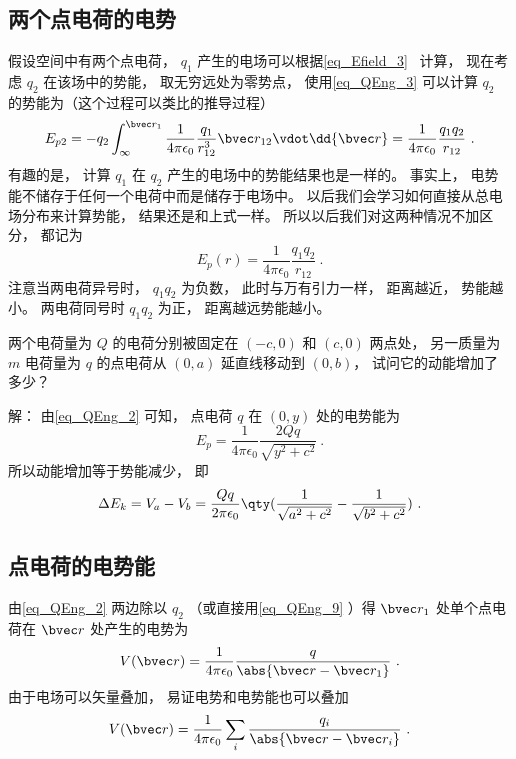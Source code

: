 \subsection{两个点电荷的电势}
假设空间中有两个点电荷， $q_1$ 产生的电场可以根据\autoref{eq_Efield_3}~ 计算， 现在考虑 $q_2$ 在该场中的势能， 取无穷远处为零势点， 使用\autoref{eq_QEng_3} 可以计算 $q_2$ 的势能为（这个过程可以类比的推导过程）
\begin{equation}
E_{p2} = -q_2 \int_{\infty}^{\bvec r_1} \frac{1}{4\pi\epsilon_0} \frac{q_1}{r_{12}^3}\bvec r_{12} \vdot \dd{\bvec r}
= \frac{1}{4\pi\epsilon_0} \frac{q_1 q_2}{r_{12}}~.
\end{equation}
有趣的是， 计算 $q_1$ 在 $q_2$ 产生的电场中的势能结果也是一样的。 事实上， 电势能不储存于任何一个电荷中而是储存于电场中。 以后我们会学习如何直接从总电场分布来计算势能， 结果还是和上式一样。 %
所以以后我们对这两种情况不加区分， 都记为
\begin{equation}\label{eq_QEng_2}
E_p(r) = \frac{1}{4\pi\epsilon_0} \frac{q_1 q_2}{r_{12}}~.
\end{equation}
注意当两电荷异号时， $q_1 q_2$ 为负数， 此时与万有引力一样， 距离越近， 势能越小。 两电荷同号时 $q_1 q_2$ 为正， 距离越远势能越小。

\begin{example}{}
两个电荷量为 $Q$ 的电荷分别被固定在 $(-c, 0)$ 和 $(c, 0)$ 两点处， 另一质量为 $m$ 电荷量为 $q$ 的点电荷从 $(0, a)$ 延直线移动到 $(0, b)$， 试问它的动能增加了多少？

解： 由\autoref{eq_QEng_2} 可知， 点电荷 $q$ 在 $(0, y)$ 处的电势能为
\begin{equation}
E_p = \frac{1}{4\pi\epsilon_0}\frac{2Qq}{\sqrt{y^2 + c^2}}~.
\end{equation}
所以动能增加等于势能减少， 即
\begin{equation}
\Delta E_k = V_a - V_b = \frac{Qq}{2\pi\epsilon_0}  \qty(\frac{1}{\sqrt{a^2 + c^2}} - \frac{1}{\sqrt{b^2 + c^2}})~.
\end{equation}
\end{example}

\subsection{点电荷的电势能}
由\autoref{eq_QEng_2} 两边除以 $q_2$ （或直接用\autoref{eq_QEng_9} ）得 $\bvec r_1$ 处单个点电荷在 $\bvec r$ 处产生的电势为
\begin{equation}
V(\bvec r) = \frac{1}{4\pi\epsilon_0} \frac{q}{\abs{\bvec r - \bvec r_1}}~.
\end{equation}
由于电场可以矢量叠加， 易证电势和电势能也可以叠加
\begin{equation}
V(\bvec r) = \frac{1}{4\pi\epsilon_0} \sum_i \frac{q_i}{\abs{\bvec r - \bvec r_i}}~.
\end{equation}

